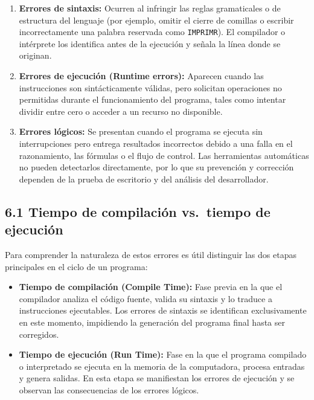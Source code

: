 \begin{enumerate}
\def\labelenumi{\arabic{enumi}.}
\item
  \textbf{Errores de sintaxis:} Ocurren al infringir las reglas
  gramaticales o de estructura del lenguaje (por ejemplo, omitir el
  cierre de comillas o escribir incorrectamente una palabra reservada
  como \texttt{IMPRIMR}). El compilador o intérprete los identifica
  antes de la ejecución y señala la línea donde se originan.
\item
  \textbf{Errores de ejecución (Runtime errors):} Aparecen cuando las
  instrucciones son sintácticamente válidas, pero solicitan operaciones
  no permitidas durante el funcionamiento del programa, tales como
  intentar dividir entre cero o acceder a un recurso no disponible.
\item
  \textbf{Errores lógicos:} Se presentan cuando el programa se ejecuta
  sin interrupciones pero entrega resultados incorrectos debido a una
  falla en el razonamiento, las fórmulas o el flujo de control. Las
  herramientas automáticas no pueden detectarlos directamente, por lo
  que su prevención y corrección dependen de la prueba de escritorio y
  del análisis del desarrollador.
\end{enumerate}

\subsection{6.1 Tiempo de compilación vs.~tiempo de
ejecución}\label{tiempo-de-compilaciuxf3n-vs.-tiempo-de-ejecuciuxf3n}

Para comprender la naturaleza de estos errores es útil distinguir las
dos etapas principales en el ciclo de un programa:

\begin{itemize}
\item
  \textbf{Tiempo de compilación (Compile Time):} Fase previa en la que
  el compilador analiza el código fuente, valida su sintaxis y lo
  traduce a instrucciones ejecutables. Los errores de sintaxis se
  identifican exclusivamente en este momento, impidiendo la generación
  del programa final hasta ser corregidos.
\item
  \textbf{Tiempo de ejecución (Run Time):} Fase en la que el programa
  compilado o interpretado se ejecuta en la memoria de la computadora,
  procesa entradas y genera salidas. En esta etapa se manifiestan los
  errores de ejecución y se observan las consecuencias de los errores
  lógicos.
\end{itemize}

